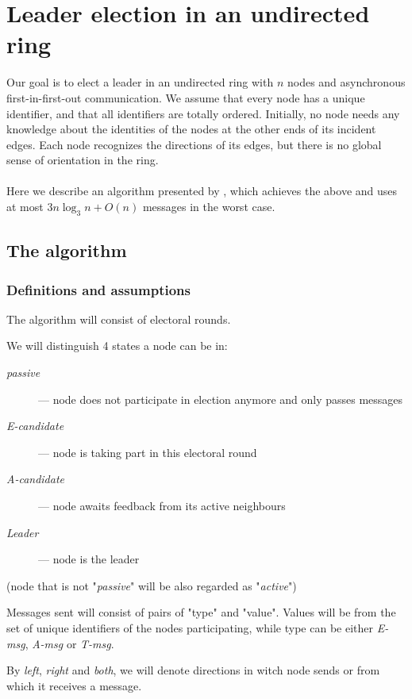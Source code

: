 \documentclass{article}
\begin{document}
\section*{Leader election in an undirected ring}
Our goal is to elect a leader in an undirected ring with $n$ nodes and asynchronous first-in-first-out communication.  We assume that every node has a unique identifier, and that all identifiers are
totally ordered. Initially, no node needs any knowledge about the identities of the nodes at the
other ends of its incident edges. Each node recognizes the directions of its edges, but there is no global sense of orientation in the ring. 
\paragraph{}
Here we describe an algorithm presented by \cite{ROTEM1987575}, which achieves the above and uses at most $3 n\log_{3}n + O(n)$ messages in the worst case.
\subsection*{The algorithm}
\subsubsection*{Definitions and assumptions}
The algorithm will consist of electoral rounds.

We will distinguish 4 states a node can be in:
\begin{description}
\item[\textit{passive}] --- node does not participate in election anymore and only passes messages
\item[\textit{E-candidate}] --- node is taking part in this electoral round
\item[\textit{A-candidate}] --- node awaits feedback from its active neighbours
\item[\textit{Leader}] --- node is the leader
\end{description}
(node that is not "\textit{passive}" will be also regarded as "\textit{active}")

Messages sent will consist of pairs of "type" and "value". Values will be from the set of unique identifiers of the nodes participating, while type can be  either \textit{E-msg}, \textit{A-msg} or \textit{T-msg}.

By  \textit{left}, \textit{right} and  \textit{both}, we will denote directions in witch node sends or from which it receives a message.
\end{document}

